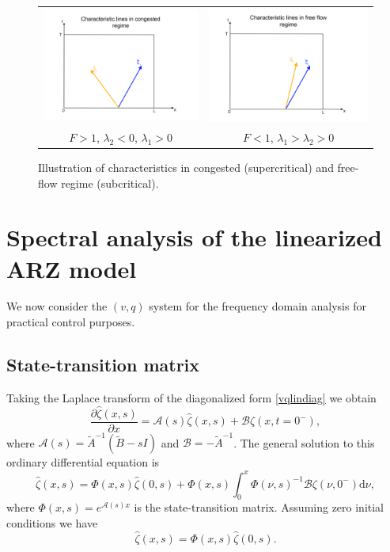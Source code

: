 \documentclass[preprint]{elsarticle}
\begin{document}
\begin{figure}
\begin{centering}
\begin{tabular}{cc}
\includegraphics[width=6cm]{Congested-regime} & \includegraphics[width=6cm]{Free-flow-regime}\tabularnewline
$F>1$, $\lambda_{2}<0$, $\lambda_{1}>0$ & $F<1$, $\lambda_{1}>\lambda_{2}>0$\tabularnewline
\end{tabular}
\par\end{centering}
\protect\caption{Illustration of characteristics in congested (supercritical) and free-flow regime (subcritical).\label{Characteristics}}
\end{figure}


\section{Spectral analysis of the linearized ARZ model}
We now consider the $(v,q)$ system for the frequency domain analysis for practical control purposes.
\subsection{State-transition matrix}
Taking the Laplace transform of the diagonalized form \eqref{vqlindiag} we obtain 
\begin{equation}
\dfrac{\partial \hat{\zeta} (x,s)}{\partial x} = \mathscr{A}(s)\hat{\zeta}(x,s) + \mathscr{B}\zeta(x,t=0^-),
\end{equation}
where $\mathscr{A}(s) = \tilde{A}^{-1}(\tilde{B} - sI)$ and $\mathscr{B} = -\tilde{A}^{-1}$. 
The general solution to this ordinary differential equation is 
\begin{equation}
\hat{\zeta}(x,s) = \Phi(x,s)\hat{\zeta}(0,s) +  \Phi(x,s) \int^x_0 \Phi(\nu,s)^{-1} \mathscr{B} \zeta(\nu,0^-)\text{d} \nu,
\end{equation}
where $\Phi(x,s) = e^{\mathscr{A}(s)x}$ is the state-transition matrix. Assuming zero initial conditions we have 
\begin{equation} \label{TFRiemann}
\hat{\zeta}(x,s) = \Phi(x,s)\hat{\zeta}(0,s).
\end{equation}
\end{document}

